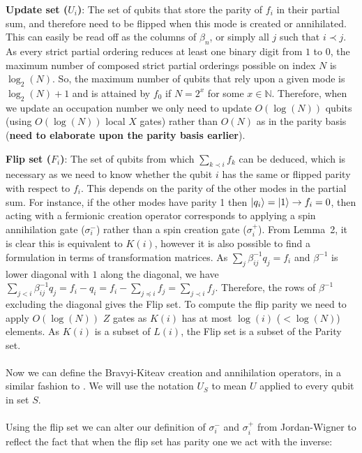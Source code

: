 \documentclass[twoside]{article}
\begin{document}
\begin{itemlist}
\item \textbf{Update set ($U_i$)}: The set of qubits that store the parity of $f_i$ in their partial sum, and therefore need to be flipped when this mode is created or annihilated. This can easily be read off as the columns of $\beta_n$, or simply all $j$ such that $i \prec j$. As every strict partial ordering reduces at least one binary digit from $1$ to $0$, the maximum number of composed strict partial orderings possible on index $N$ is $\log_2(N)$. So, the maximum number of qubits that rely upon a given mode is $\log_2(N) + 1$ and is attained by $f_0$ if $N = 2^x$ for some $x \in \mathbb{N}$. Therefore, when we update an occupation number we only need to update $O(\log(N))$ qubits (using $O(\log(N))$ local $X$ gates) rather than $O(N)$ as in the parity basis (\textbf{need to elaborate upon the parity basis earlier}). \\ 
\item \textbf{Flip set ($F_i$)}: The set of qubits from which $\sum_{k \prec i} f_k$ can be deduced, which is necessary as we need to know whether the qubit $i$ has the same or flipped parity with respect to $f_i$. This depends on the parity of the other modes in the partial sum. For instance, if the other modes have parity 1 then $\ket{q_i} = \ket{1} \rightarrow f_i = 0$, then acting with a fermionic creation operator corresponds to applying a spin annihilation gate ($\sigma^-_i$) rather than a spin creation gate ($\sigma^+_i$). From Lemma~2, it is clear this is equivalent to $K(i)$, however it is also possible to find a formulation in terms of transformation matrices. As $\sum_j \beta^{-1}_{ij}q_j = f_i$ and $\beta^{-1}$ is lower diagonal with $1$ along the diagonal, we have $\sum_{j<i} \beta^{-1}_{ij}q_j = f_i - q_i = f_i - \sum_{j \preceq i} f_j  = \sum_{j\prec i} f_j$. Therefore, the rows of $\beta^{-1}$ excluding the diagonal gives the Flip set. To compute the flip parity we need to apply $O(\log(N))$ $Z$ gates as $K(i)$ has at most $\log(i)$ ($< \log(N)$) elements. As $K(i)$ is a subset of $L(i)$, the Flip set is a subset of the Parity set.\\\\
        Now we can define the Bravyi-Kiteav creation and annihilation operators, in a similar fashion to \cite{seeley}. We will use the notation $U_S$ to mean $U$ applied to every qubit in set $S$.\\\\
        Using the flip set we can alter our definition of $\sigma^-_i$ and $\sigma^+_i$ from Jordan-Wigner to reflect the fact that when the flip set has parity one we act with the inverse:

\end{itemlist}
\end{document}
